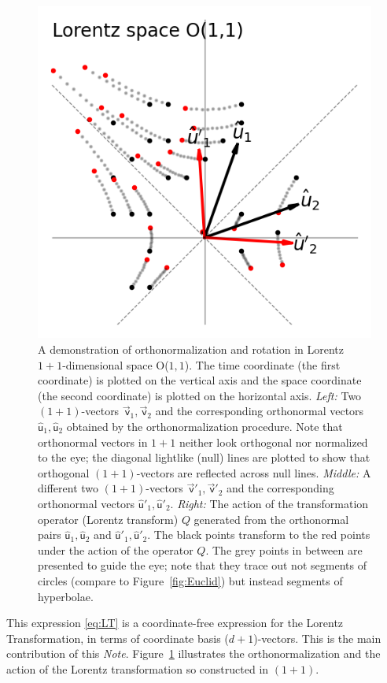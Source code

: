 \documentclass{article}
\newcommand\upvec[1]{\!\vec{\,\mathrm{#1}}}
\newcommand{\Lvec}[1]{\upvec{\mathsf{#1}}} %
\newcommand{\Lhat}[1]{\hat{\mathsf{#1}}} %
\newcommand{\plus}{\!+\!} %
\newcommand{\documentname}{\textsl{Note}}
\newcommand{\figref}[1]{Figure~\ref{#1}}
\newlength{\figurewidth}
\begin{document}
\begin{figure}[t]
\begin{mdframed}
\includegraphics[width=\figurewidth]{L_Q.png}
\caption{A demonstration of orthonormalization and rotation in Lorentz $1\plus1$-dimensional space O($1,1$).
The time coordinate (the first coordinate) is plotted on the vertical axis and the space coordinate (the second coordinate) is plotted on the horizontal axis.
\textsl{Left:} Two $(1\plus1)$-vectors $\Lvec{v}_1, \Lvec{v}_2$ and the corresponding orthonormal vectors $\Lhat{u}_1, \Lhat{u}_2$ obtained by the orthonormalization procedure.
Note that orthonormal vectors in $1\plus1$ neither look orthogonal nor normalized to the eye; the diagonal lightlike (null) lines are plotted to show that orthogonal $(1\plus1)$-vectors are reflected across null lines.
\textsl{Middle:} A different two $(1\plus1)$-vectors $\Lvec{v}'_1, \Lvec{v}'_2$ and the corresponding orthonormal vectors $\Lhat{u}'_1, \Lhat{u}'_2$.
\textsl{Right:} The action of the transformation operator (Lorentz transform) $Q$ generated from the orthonormal pairs $\Lhat{u}_1, \Lhat{u}_2$ and $\Lhat{u}'_1, \Lhat{u}'_2$.
The black points transform to the red points under the action of the operator $Q$.
The grey points in between are presented to guide the eye; 
note that they trace out not segments of circles (compare to \figref{fig:Euclid}) but instead segments of hyperbolae.\label{fig:Lorentz}}
\end{mdframed}
\end{figure}
This expression \eqref{eq:LT} is a coordinate-free expression for the Lorentz Transformation, in terms of coordinate basis ($d\plus1$)-vectors.
This is the main contribution of this \documentname.
\figref{fig:Lorentz} illustrates the orthonormalization and the action of the Lorentz transformation so constructed in $(1\plus1)$.
\end{document}
